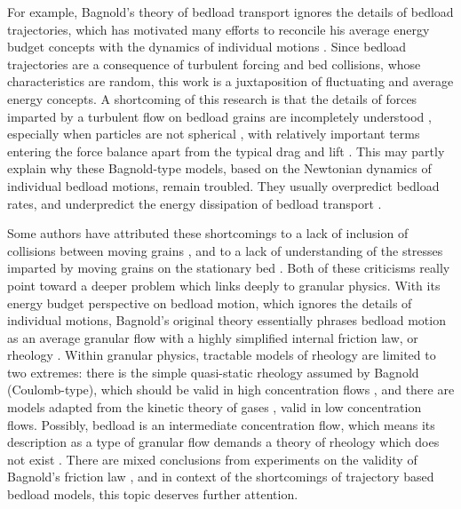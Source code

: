 \documentclass{article}
\begin{document}
For example, Bagnold's theory of bedload transport ignores the details of bedload trajectories, which has motivated many efforts to reconcile his average energy budget concepts with the dynamics of individual motions \citep{VanRijn1984, Bridge1984, Wiberg1989, Bridge1992, Nino1998, Bialik2015}. 
Since bedload trajectories are a consequence of turbulent forcing and bed collisions, whose characteristics are random, this work is a juxtaposition of fluctuating and average energy concepts. 
A shortcoming of this research is that the details of forces imparted by a turbulent flow on bedload grains are incompletely understood \citep{Schmeeckle2007, Dwivedi2010, Dwivedi2011}, especially when particles are not spherical \citep{Maxey1983a}, with relatively important terms entering the force balance apart from the typical drag and lift \citep{Bialik2015}.
This may partly explain why these Bagnold-type models, based on the Newtonian dynamics of individual bedload motions, remain troubled. 
They usually overpredict bedload rates, and underpredict the energy dissipation of bedload transport \citep{Bridge1984, Bialik2015}. 

Some authors have attributed these shortcomings to a lack of inclusion of 
 collisions between moving grains \citep{Lee2002}, and to a lack of understanding of the stresses imparted by moving grains on the stationary bed \citep{Nino1998}.
Both of these criticisms really point toward a deeper problem which links deeply to granular physics.
With its energy budget perspective on bedload motion, which ignores the details of individual motions, Bagnold's original theory essentially phrases bedload motion as an average granular flow with a highly simplified internal friction law, or rheology \citep{Frey2014}. 
Within granular physics, tractable models of rheology are limited to two extremes: there is the simple quasi-static rheology assumed by Bagnold (Coulomb-type), which should be valid in high concentration flows \citep{Berker1992}, and there are models adapted from the kinetic theory of gases \citep{Jenkins1998}, valid in low concentration flows. 
Possibly, bedload is an intermediate concentration flow, which means its description as a type of granular flow demands a theory of rheology which does not exist \citep{Frey2011, Frey2014}. 
There are mixed conclusions from experiments on the validity of Bagnold's friction law \citep{Silbert2001, Frey2014, Houssais2016}, and in context of the shortcomings of trajectory based bedload models, this topic deserves further attention.  
\end{document}
